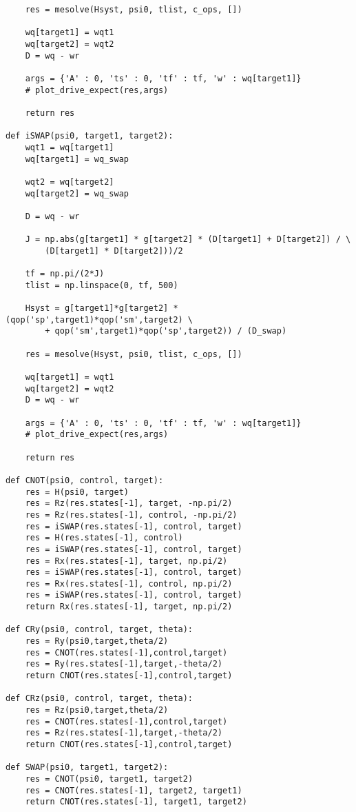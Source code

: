 \begin{verbatim}
    res = mesolve(Hsyst, psi0, tlist, c_ops, [])

    wq[target1] = wqt1
    wq[target2] = wqt2
    D = wq - wr

    args = {'A' : 0, 'ts' : 0, 'tf' : tf, 'w' : wq[target1]}
    # plot_drive_expect(res,args)

    return res

def iSWAP(psi0, target1, target2):
    wqt1 = wq[target1]
    wq[target1] = wq_swap
    
    wqt2 = wq[target2]
    wq[target2] = wq_swap

    D = wq - wr

    J = np.abs(g[target1] * g[target2] * (D[target1] + D[target2]) / \
        (D[target1] * D[target2]))/2

    tf = np.pi/(2*J)
    tlist = np.linspace(0, tf, 500)

    Hsyst = g[target1]*g[target2] * (qop('sp',target1)*qop('sm',target2) \
        + qop('sm',target1)*qop('sp',target2)) / (D_swap)

    res = mesolve(Hsyst, psi0, tlist, c_ops, [])

    wq[target1] = wqt1
    wq[target2] = wqt2
    D = wq - wr

    args = {'A' : 0, 'ts' : 0, 'tf' : tf, 'w' : wq[target1]}
    # plot_drive_expect(res,args)

    return res

def CNOT(psi0, control, target):
    res = H(psi0, target)
    res = Rz(res.states[-1], target, -np.pi/2)
    res = Rz(res.states[-1], control, -np.pi/2)
    res = iSWAP(res.states[-1], control, target)
    res = H(res.states[-1], control)
    res = iSWAP(res.states[-1], control, target)
    res = Rx(res.states[-1], target, np.pi/2)
    res = iSWAP(res.states[-1], control, target)
    res = Rx(res.states[-1], control, np.pi/2)
    res = iSWAP(res.states[-1], control, target)
    return Rx(res.states[-1], target, np.pi/2)

def CRy(psi0, control, target, theta):
    res = Ry(psi0,target,theta/2)
    res = CNOT(res.states[-1],control,target)
    res = Ry(res.states[-1],target,-theta/2)
    return CNOT(res.states[-1],control,target)

def CRz(psi0, control, target, theta):
    res = Rz(psi0,target,theta/2)
    res = CNOT(res.states[-1],control,target)
    res = Rz(res.states[-1],target,-theta/2)
    return CNOT(res.states[-1],control,target)

def SWAP(psi0, target1, target2):
    res = CNOT(psi0, target1, target2)
    res = CNOT(res.states[-1], target2, target1)
    return CNOT(res.states[-1], target1, target2)


\end{verbatim}
